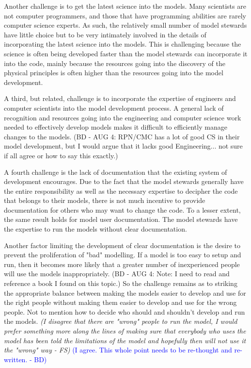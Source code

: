 \documentclass[hess]{copernicus}
\begin{document}
Another challenge is to get the latest science into the models. Many scientists are not computer programmers, and those that have programming abilities are rarely computer science experts. As such, the relatively small number of model stewards have little choice but to be very intimately involved in the details of incorporating the latest science into the models. This is challenging because the science is often being developed faster than the model stewards can incorporate it into the code, mainly because the resources going into the discovery of the physical principles is often higher than the resources going into the model development.

A third, but related, challenge is to incorporate the expertise of engineers and computer scientists into the model development process. A general lack of recognition and resources going into the engineering and computer science work needed to effectively develop models makes it difficult to efficiently manage changes to the models. (BD - AUG 4: RPN/CMC has a lot of good CS in their model development, but I would argue that it lacks good Engineering... not sure if all agree or how to say this exactly.)

A fourth challenge is the lack of documentation that the existing system of development encourages. Due to the fact that the model stewards generally have the entire responsibility as well as the necessary expertise to decipher the code that belongs to their models, there is not much incentive to provide documentation for others who may want to change the code. To a lesser extent, the same result holds for model user documentation. The model stewards have the expertise to run the models without clear documentation. 

Another factor limiting the development of clear documentation is the desire to prevent the proliferation of "bad" modelling. If a model is too easy to setup and run, then it becomes more likely that a greater number of inexperienced people will use the models inappropriately. (BD - AUG 4: Note: I need to read and reference a book I found on this topic.) So the challenge remains as to striking the appropriate balance between making the models easier to develop and use for the right people without making them easier to develop and use for the wrong people. Not to mention how to decide who should and shouldn't develop and run the models. {\em (I disagree that there are "wrong" people to run the model, I would prefer something more along the lines of making sure that everybody who uses the model has been told the limitations of the model and hopefully then will not use it the "wrong" way - FS)}\textcolor{blue}{ (I agree. This whole point needs to be re-thought and re-written. - BD)}
\end{document}
